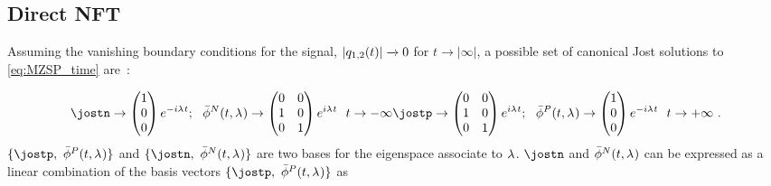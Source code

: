 \subsection{Direct NFT}\label{ssec:direct_NFT_Manakov}

Assuming the vanishing boundary conditions for the signal, \mbox{$|\nflds[1,2]|\xrightarrow{} 0$} for $t\xrightarrow{} |\infty|$, a possible set of canonical Jost solutions to \eqref{eq:MZSP_time} are~\cite{Ablowitz2004a}:

\begin{subequations}\label{eq:dp_jost}
  \begin{align}
  \compactmat
  \jostn \rightarrow \begin{pmatrix}
                1 \\
                0 \\
                0
              \end{pmatrix}e^{-\iunit \eig \nttm}; \ \
  \jostnconj\rightarrow \begin{pmatrix}
                  0 & 0 \\
                  1 & 0 \\
                  0 & 1
                \end{pmatrix}e^{\iunit \eig \nttm} \ \
  \nttm \rightarrow -\infty
  \end{align}

  \begin{align}
  \compactmat
  \jostp\rightarrow  \begin{pmatrix}
                0 & 0 \\
                1 & 0 \\
                0 & 1
              \end{pmatrix}e^{\iunit \eig \nttm}; \ \
  \jostpconj\rightarrow \begin{pmatrix}
                  1 \\
                  0 \\
                  0
                \end{pmatrix}e^{-\iunit \eig \nttm} \ \
  \nttm \rightarrow +\infty~.
  \end{align}
\end{subequations}
$\{\jostp,~\jostpconj\}$
and $\{\jostn,~\jostnconj\}$ are two bases for the eigenspace associate to $\eig$. $\jostn$ and $\jostnconj$ can be expressed as a linear combination of the basis vectors $\{\jostp,~\jostpconj\}$ as


